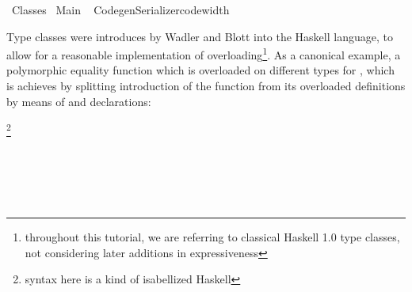 %
\begin{isabellebody}%
\def\isabellecontext{Classes}%
%
\isadelimtheory
\isanewline
\isanewline
\isanewline
%
\endisadelimtheory
%
\isatagtheory
{}\isamarkupfalse%
\ Classes\isanewline
{}\ Main\isanewline
{}%
\endisatagtheory
{\isafoldtheory}%
%
\isadelimtheory
\isanewline
%
\endisadelimtheory
%
\isadelimML
\isanewline
%
\endisadelimML
%
\isatagML
{}\isamarkupfalse%
\ {\isacharverbatimopen}\isanewline
CodegenSerializer{\isachardot}code{\isacharunderscore}width\ {\isacharcolon}{\isacharequal}\ {}{}{\isacharsemicolon}\isanewline
{\isacharverbatimclose}\isanewline
%
\endisatagML
{\isafoldML}%
%
\isadelimML
%
\endisadelimML
%
\isadelimML
%
\endisadelimML
%
\isatagML
%
\endisatagML
{\isafoldML}%
%
\isadelimML
%
\endisadelimML
%
\isamarkuptrue%
%
\isamarkuptrue%
%
\begin{isamarkuptext}%
Type classes were introduces by Wadler and Blott \cite{wadler89how}
  into the Haskell language, to allow for a reasonable implementation
  of overloading\footnote{throughout this tutorial, we are referring
  to classical Haskell 1.0 type classes, not considering
  later additions in expressiveness}.
  As a canonical example, a polymorphic equality function
   which is overloaded on different
  types for \isa{{\isasymalpha}}, which is achieves by splitting introduction
  of the  function from its overloaded definitions by means
  of  and  declarations:

  \medskip\noindent\hspace*{2ex}\footnote{syntax here is a kind of isabellized Haskell} \\
  \hspace*{4ex}

  \medskip\noindent\hspace*{2ex} \\
  \hspace*{4ex} \\
  \hspace*{4ex} \\
  \hspace*{4ex} \\
  \hspace*{4ex}


\end{isamarkuptext}
\end{isabellebody}
